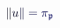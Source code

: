 \documentclass[12pt]{article}
\begin{document}
\makeatletter
\renewcommand*{\@textcolor}[3]{%
  \protect\leavevmode
  \begingroup
    \color#1{#2}#3%
  \endgroup
}
\makeatother
\begin{displaymath}
\mathcolor[RGB]{0,0,15}{\|} \mathcolor[RGB]{0,0,30}{u} \mathcolor[RGB]{0,0,45}{\|} \mathcolor[RGB]{0,0,60}{=} \mathcolor[RGB]{0,0,75}{\pi} _ { \mathfrak { \mathcolor[RGB]{0,0,90}{p} } }
\end{displaymath}
\end{document}
